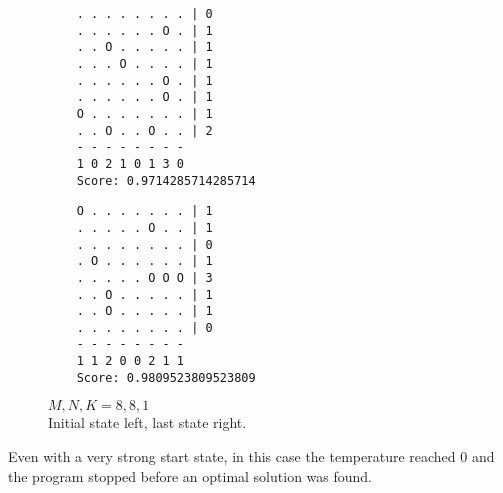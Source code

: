 \begin{figure}[h!]
\begin{multicols}{2}
    \begin{verbatim}
    . . . . . . . . | 0
    . . . . . . O . | 1
    . . O . . . . . | 1
    . . . O . . . . | 1
    . . . . . . O . | 1
    . . . . . . O . | 1
    O . . . . . . . | 1
    . . O . . O . . | 2
    - - - - - - - -
    1 0 2 1 0 1 3 0
    Score: 0.9714285714285714
    \end{verbatim}
    \columnbreak
    \begin{verbatim}
    O . . . . . . . | 1
    . . . . . O . . | 1
    . . . . . . . . | 0
    . O . . . . . . | 1
    . . . . . O O O | 3
    . . O . . . . . | 1
    . . O . . . . . | 1
    . . . . . . . . | 0
    - - - - - - - -
    1 1 2 0 0 2 1 1
    Score: 0.9809523809523809
    \end{verbatim}
    \end{multicols}
\caption{$M, N, K = 8, 8, 1$\\
Initial state left, last state right.}
\end{figure}
Even with a very strong start state,
in this case the temperature reached 0 and the program stopped before an optimal solution was found.